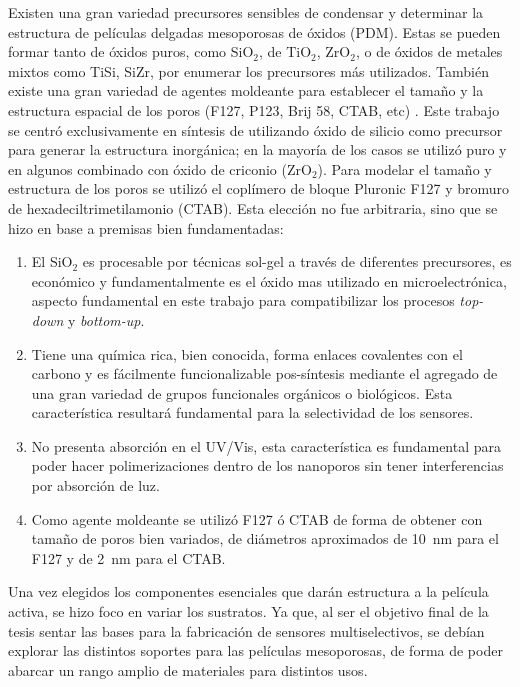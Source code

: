 	Existen una gran variedad precursores sensibles de condensar y determinar la estructura de películas delgadas mesoporosas de óxidos (PDM). Estas se pueden formar tanto de óxidos puros, como SiO$_2$, de TiO$_2$, ZrO$_2$, o de óxidos de metales mixtos como TiSi, SiZr, por enumerar los precursores más utilizados. También existe una gran variedad de agentes moldeante para establecer el tamaño y la estructura espacial de los poros (F127, P123, Brij 58, CTAB, etc) \cite{angelome2011,schuth2013,Soler-Illia2006,Soler-Illia2002a}. Este trabajo se centró exclusivamente en síntesis de \pdm\space utilizando óxido de silicio como precursor para generar la estructura inorgánica; en la mayoría de los casos se utilizó puro y en algunos combinado con óxido de criconio (ZrO$_2$). Para modelar el tamaño y estructura de los poros se utilizó el coplímero de bloque Pluronic F127 y bromuro de hexadeciltrimetilamonio (CTAB). Esta elección no fue arbitraria, sino que se hizo en base a premisas bien fundamentadas:
		
		\begin{enumerate}

		\item El SiO$_2$ es procesable por técnicas sol-gel a través de diferentes precursores, es económico y fundamentalmente es el óxido mas utilizado en microelectrónica, aspecto fundamental en este trabajo para compatibilizar los procesos \textit{top-down} y \textit{bottom-up}.

		\item Tiene una química rica, bien conocida, forma enlaces covalentes con el carbono y es fácilmente funcionalizable pos-síntesis mediante el agregado de una gran variedad de grupos funcionales orgánicos o biológicos. Esta característica resultará fundamental para la selectividad de los sensores.

		\item No presenta absorción en el UV/Vis, esta característica es fundamental para poder hacer polimerizaciones dentro de los nanoporos sin tener interferencias por absorción de luz.

		\item Como agente moldeante se utilizó F127 ó CTAB de forma de obtener \pdm\space con tamaño de poros bien variados, de diámetros aproximados de \SI{10}{\nm} para el F127 y de \SI{2}{\nm} para el CTAB.

		\end{enumerate}
	
	Una vez elegidos los componentes esenciales que darán estructura a la película activa, se hizo foco en variar los sustratos. Ya que, al ser el objetivo final de la tesis sentar las bases para la fabricación de sensores multiselectivos, se debían explorar las distintos soportes para las películas mesoporosas, de forma de poder abarcar un rango amplio de materiales para distintos usos.

